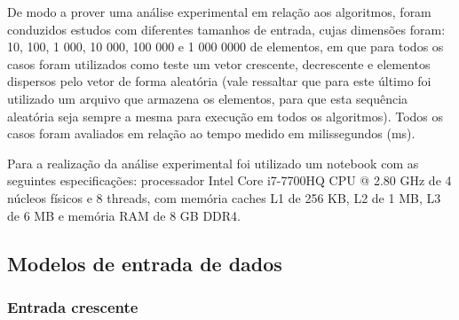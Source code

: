 \documentclass[conference]{IEEEtran}
\begin{document}
De modo a prover uma análise experimental em relação aos algoritmos, foram conduzidos estudos com diferentes tamanhos de entrada, cujas dimensões foram: 10, 100, 1 000, 10 000, 100 000 e 1 000 0000 de elementos, em que para todos os casos foram utilizados como teste um vetor crescente, decrescente e elementos dispersos pelo vetor de forma aleatória (vale ressaltar que para este último foi utilizado um arquivo que armazena os elementos, para que esta sequência aleatória seja sempre a mesma para execução em todos os algoritmos). Todos os casos foram avaliados em relação ao tempo medido em milissegundos (ms).

Para a realização da análise experimental foi utilizado um notebook com as seguintes especificações: processador Intel Core i7-7700HQ CPU @ 2.80 GHz de 4 núcleos físicos e 8 threads, com memória
caches L1 de 256 KB, L2 de 1 MB, L3 de 6 MB e memória
RAM de 8 GB DDR4.


\subsection{Modelos de entrada de dados}

\subsubsection{Entrada crescente}


\centering
{}
\end{document}
